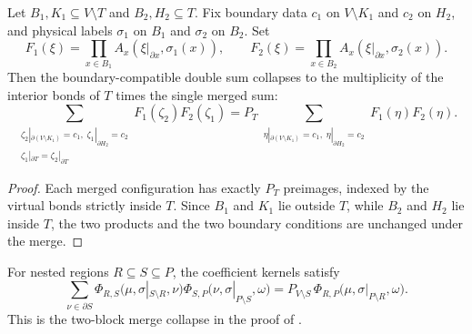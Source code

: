 \begin{lemma}
    \label{lem:peps_two_block_merge_collapse}
    \leanok
    Let $B_1,K_1\subseteq V\setminus T$ and $B_2,H_2\subseteq T$.  Fix
    boundary data $c_1$ on $V\setminus K_1$ and $c_2$ on $H_2$, and physical
    labels $\sigma_1$ on $B_1$ and $\sigma_2$ on $B_2$.  Set
    \[
        F_1(\xi)=\prod_{x\in B_1}A_x(\xi|_{\partial x},\sigma_1(x)),
        \qquad
        F_2(\xi)=\prod_{x\in B_2}A_x(\xi|_{\partial x},\sigma_2(x)).
    \]
    Then the
    boundary-compatible double sum collapses to the multiplicity of the
    interior bonds of $T$ times the single merged sum:
    \[
        \sum_{\substack{
            \zeta_2|_{\partial(V\setminus K_1)}=c_1,\;
            \zeta_1|_{\partial H_2}=c_2\\
            \zeta_1|_{\partial T}=\zeta_2|_{\partial T}}}
        F_1(\zeta_2)F_2(\zeta_1)
        =
        P_T
        \sum_{\substack{
            \eta|_{\partial(V\setminus K_1)}=c_1,\;
            \eta|_{\partial H_2}=c_2}}
        F_1(\eta)F_2(\eta).
    \]
\end{lemma}
\begin{proof}
    \leanok
    Each merged configuration has exactly $P_T$ preimages, indexed by the
    virtual bonds strictly inside $T$.  Since $B_1$ and $K_1$ lie outside
    $T$, while $B_2$ and $H_2$ lie inside $T$, the two products and the two
    boundary conditions are unchanged under the merge.
\end{proof}

\begin{theorem}
    \label{thm:peps_corner_extension_coefficient_composition}
    \leanok
    For nested regions $R\subseteq S\subseteq P$, the coefficient kernels
    satisfy
    \[
        \sum_{\nu\in\partial S}
        \Phi_{R,S}\bigl(\mu,\sigma|_{S\setminus R},\nu\bigr)
        \Phi_{S,P}\bigl(\nu,\sigma|_{P\setminus S},\omega\bigr)
        =
        P_{V\setminus S}\,
        \Phi_{R,P}\bigl(\mu,\sigma|_{P\setminus R},\omega\bigr).
    \]
    This is the two-block merge collapse in the proof of
    \cite[Section~4, proof of Theorem~3]{Molnar2018NormalPEPS}.
\end{theorem}

